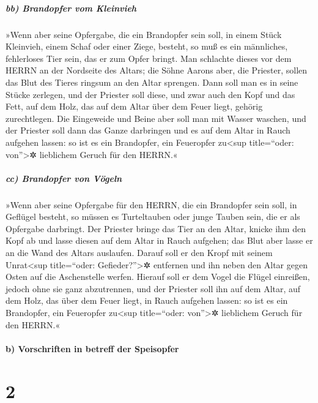 \hypertarget{bb-brandopfer-vom-kleinvieh}{%
\subparagraph{bb) Brandopfer vom
Kleinvieh}\label{bb-brandopfer-vom-kleinvieh}}

»Wenn aber seine Opfergabe, die ein Brandopfer sein soll,
in einem Stück Kleinvieh, einem Schaf oder einer Ziege, besteht, so muß
es ein männliches, fehlerloses Tier sein, das er zum Opfer bringt.
Man schlachte dieses vor dem HERRN an der Nordseite des
Altars; die Söhne Aarons aber, die Priester, sollen das Blut des Tieres
ringsum an den Altar sprengen. Dann soll man es in seine
Stücke zerlegen, und der Priester soll diese, und zwar auch den Kopf und
das Fett, auf dem Holz, das auf dem Altar über dem Feuer liegt, gehörig
zurechtlegen. Die Eingeweide und Beine aber soll man mit
Wasser waschen, und der Priester soll dann das Ganze darbringen und es
auf dem Altar in Rauch aufgehen lassen: so ist es ein Brandopfer, ein
Feueropfer zu\textless sup title=``oder: von''\textgreater✲ lieblichem
Geruch für den HERRN.«

\hypertarget{cc-brandopfer-von-vuxf6geln}{%
\subparagraph{cc) Brandopfer von
Vögeln}\label{cc-brandopfer-von-vuxf6geln}}

»Wenn aber seine Opfergabe für den HERRN, die ein
Brandopfer sein soll, in Geflügel besteht, so müssen es Turteltauben
oder junge Tauben sein, die er als Opfergabe darbringt.
Der Priester bringe das Tier an den Altar, knicke ihm den
Kopf ab und lasse diesen auf dem Altar in Rauch aufgehen; das Blut aber
lasse er an die Wand des Altars auslaufen. Darauf soll er
den Kropf mit seinem Unrat\textless sup title=``oder:
Gefieder?''\textgreater✲ entfernen und ihn neben den Altar gegen Osten
auf die Aschenstelle werfen. Hierauf soll er dem Vogel
die Flügel einreißen, jedoch ohne sie ganz abzutrennen, und der Priester
soll ihn auf dem Altar, auf dem Holz, das über dem Feuer liegt, in Rauch
aufgehen lassen: so ist es ein Brandopfer, ein Feueropfer
zu\textless sup title=``oder: von''\textgreater✲ lieblichem Geruch für
den HERRN.«

\hypertarget{b-vorschriften-in-betreff-der-speisopfer}{%
\paragraph{b) Vorschriften in betreff der
Speisopfer}\label{b-vorschriften-in-betreff-der-speisopfer}}

\hypertarget{section-1}{%
\section{2}\label{section-1}}

